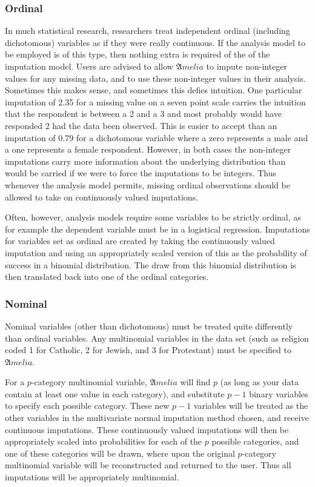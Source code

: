 \documentclass[12pt,titlepage]{article}
\begin{document}
\subsubsection{Ordinal}
\label{sec:ord}
In much statistical research, researchers treat independent ordinal (including dichotomous) variables as if they were really continuous. If the analysis model to be employed is of this type, then nothing extra is required of the of the imputation model. Users are advised to allow ${\mathfrak Amelia}$ to impute non-integer values for any missing data, and to use these non-integer values in their analysis. Sometimes this makes sense, and sometimes this defies intuition. One particular imputation of 2.35 for a missing value on a seven point scale carries the intuition that the respondent is between a 2 and a 3 and most probably would have responded 2 had the data been observed. This is easier to accept than an imputation of 0.79 for a dichotomous variable where a zero represents a male and a one represents a female respondent. However, in both cases the non-integer imputations carry more information about the underlying distribution than would be carried if we were to force the imputations to be integers. Thus whenever the analysis model permits, missing ordinal observations should be allowed to take on continuously valued imputations. 

Often, however, analysis models require some variables to be strictly ordinal, as for example the dependent variable must be in a logistical regression.   Imputations for variables set as ordinal are created by taking the continuously valued imputation and using an appropriately scaled version of this as the probability of success in a binomial distribution. The draw from this binomial distribution is then translated back into one of the ordinal categories.

\subsubsection{Nominal}
\label{sec:nom}
Nominal variables (other than dichotomous) must be treated quite differently than ordinal variables. Any multinomial variables in the data set (such as religion coded 1 for Catholic, 2 for Jewish, and 3 for Protestant) must be specified to ${\mathfrak Amelia}$.

For a $ p$-category multinomial variable, ${\mathfrak Amelia}$ will find $ p$ (as long as your data contain at least one value in each category), and substitute $ p-1$ binary variables to specify each possible category. These new $ p-1$ variables will be treated as the other variables in the multivariate normal imputation method chosen, and receive continuous imputations. These continuously valued imputations will then be appropriately scaled into probabilities for each of the $ p$ possible categories, and one of these categories will be drawn, where upon the original $ p$-category multinomial variable will be reconstructed and returned to the user. Thus all imputations will be appropriately multinomial.
\end{document}
